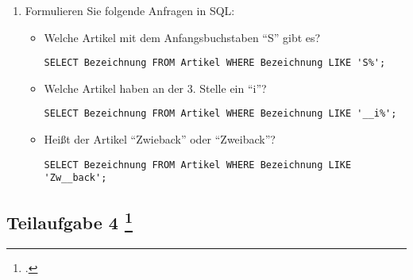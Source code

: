 \documentclass{lehramt-informatik-aufgabe}
\begin{document}
\begin{enumerate}
\item Formulieren Sie folgende Anfragen in SQL:

\begin{itemize}


\item Welche Artikel mit dem Anfangsbuchstaben “S” gibt es?

\begin{antwort}[muster]
\begin{verbatim}
SELECT Bezeichnung FROM Artikel WHERE Bezeichnung LIKE 'S%';
\end{verbatim}
\end{antwort}


\item Welche Artikel haben an der 3. Stelle ein “i”?

\begin{antwort}[muster]
\begin{verbatim}
SELECT Bezeichnung FROM Artikel WHERE Bezeichnung LIKE '__i%';
\end{verbatim}
\end{antwort}


\item Heißt der Artikel “Zwieback” oder “Zweiback”?

\begin{antwort}[muster]
\begin{verbatim}
SELECT Bezeichnung FROM Artikel WHERE Bezeichnung LIKE 'Zw__back';
\end{verbatim}
\end{antwort}
\end{itemize}
\end{enumerate}

%

\subsection{Teilaufgabe 4
\footcite[Aufgabe 2: noch mal Kaufhaus...]{db:ab:7}}
\end{document}
